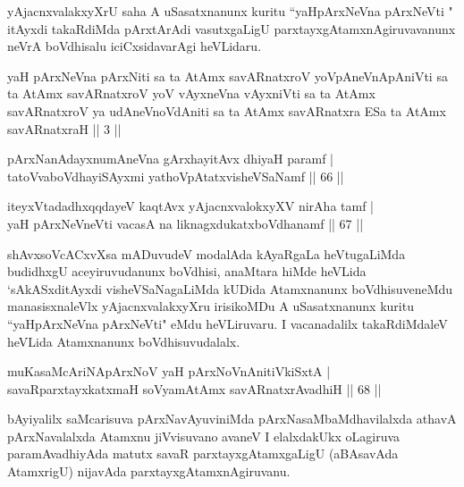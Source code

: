 \begin{artha}
yAjacnxvalakxyXrU saha A uSasatxnanunx kuritu ``yaHpArxNeVna pArxNeVti " itAyxdi takaRdiMda pArxtArAdi vasutxgaLigU parxtayxgAtamxnAgiruvavanunx neVrA boVdhisalu iciCxsidavarAgi heVLidaru.
\end{artha}


\begin{kandikeshl}
yaH pArxNeVna pArxNiti sa ta AtAmx savARnatxroV yoV\s pAneVnApAniVti sa ta AtAmx savARnatxroV yoV vAyxneVna vAyxniVti sa ta AtAmx savARnatxroV ya udAneVnoVdAniti sa ta AtAmx savARnatxra ESa ta AtAmx savARnatxraH || 3 ||
\end{kandikeshl}

\begin{shl}
pArxNanAdayxnumAneVna gArxhayitAvx dhiyaH paramf |\\
tatoV\s vaboVdhayiSAyxmi yathoVpAtatxvisheVSaNamf \hfill || 66 ||
\end{shl}

\begin{shl}
iteyxVtadadhxqqdayeV kaqtAvx yAjacnxvalokxyXV nirAha tamf |\\
yaH pArxNeVneVti vacasA na liknagxdukatxboVdhanamf \hfill || 67 ||
\end{shl}

\begin{artha}
shAvxsoVcACxvXsa mADuvudeV modalAda kAyaRgaLa heVtugaLiMda budidhxgU aceyiruvudanunx boVdhisi, anaMtara hiMde heVLida `sAkASxditAyxdi visheVSaNagaLiMda kUDida Atamxnanunx boVdhisuveneMdu manasisxnaleVlx yAjacnxvalakxyXru irisikoMDu A uSasatxnanunx kuritu ``yaHpArxNeVna pArxNeVti" eMdu heVLiruvaru. I vacanadalilx takaRdiMdaleV heVLida Atamxnanunx boVdhisuvudalalx.
\end{artha}%


\begin{shl}
muKasaMcAriNA\s pArxNoV yaH pArxNoVnAnitiVkiSxtA |\\
savaRparxtayxkatxmaH soV\s yamAtAmx savARnatxrAvadhiH \hfill || 68 ||
\end{shl}

\begin{artha}
bAyiyalilx saMcarisuva pArxNavAyuviniMda pArxNasaMbaMdhavilalxda athavA pArxNavalalxda Atamxnu jiVvisuvano avaneV I elalxdakUkx oLagiruva paramAvadhiyAda matutx savaR parxtayxgAtamxgaLigU (aBAsavAda AtamxrigU) nijavAda parxtayxgAtamxnAgiruvanu.
\end{artha}

